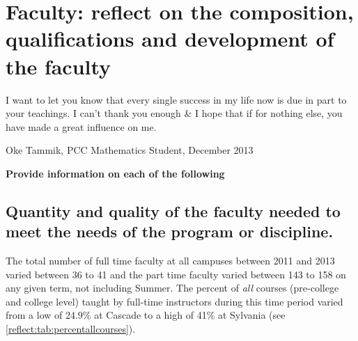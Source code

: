 \chapter[Faculty composition and qualifications]{Faculty:  reflect on the
composition, qualifications and development of the faculty}
\epigraph{ I want to let you know that every single success in my life now is due in part to your teachings.  I can't thank you enough \& I hope that if for nothing else, you have made a great influence on me.}{Oke Tammik, PCC Mathematics Student, December 2013}

{\bfseries Provide information on each of the following}
\section{Quantity and quality of the faculty needed to meet the needs of the
program or discipline.}
The total number of full time faculty at all campuses between 2011 and 2013
varied between 36 to 41 and the 
part time faculty varied between 143 to 158 on any given term,  not including
Summer.     The percent of \emph{all} courses (pre-college and college level)
taught by full-time instructors during this time period varied from a low of
24.9\% at Cascade to a high of 41\% at Sylvania (see
\cref{reflect:tab:percentallcourses}).

